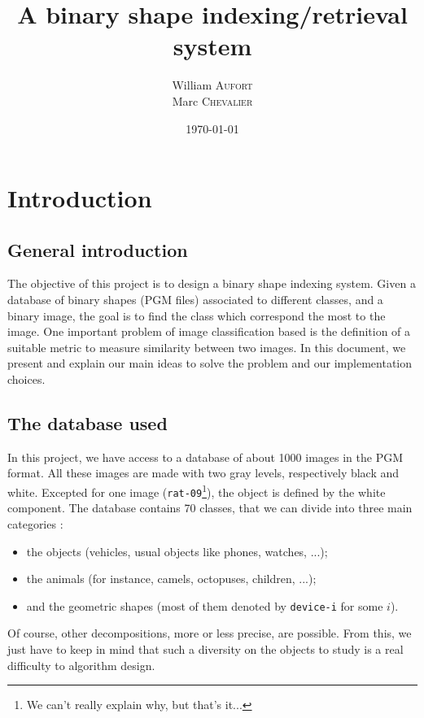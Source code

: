 

\title{A binary shape indexing/retrieval system}
\author{
    William \textsc{Aufort}\\
    Marc \textsc{Chevalier}
}
\date{\today}


\maketitle

\section*{Introduction}

\subsection*{General introduction}

The objective of this project is to design a binary shape indexing system. Given a database of binary shapes (PGM files) associated to different classes, and a binary image, the goal is to find the class which correspond the most to the image.
One important problem of image classification based is the definition of a suitable metric to measure similarity between two images. In this document, we present and explain our main ideas to solve the problem and our implementation choices.

\subsection*{The database used}

In this project, we have access to a database of about 1000 images in the PGM format. All these images are made with two gray levels, respectively black and white. Excepted for one image (\texttt{rat-09}\footnote{We can't really explain why, but that's it...}), the object is defined by the white component. The database contains 70 classes, that we can divide into three main categories :
\begin{itemize}
	\item the objects (vehicles, usual objects like phones, watches, ...);
	\item the animals (for instance, camels, octopuses, children, ...);
	\item and the geometric shapes (most of them denoted by \texttt{device-i} for some $i$).
\end{itemize}

Of course, other decompositions, more or less precise, are possible. From this, we just have to keep in mind that such a diversity on the objects to study is a real difficulty to algorithm design.

